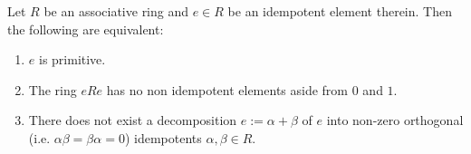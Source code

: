             \begin{proposition} \label{prop: primitive_idempotents_are_indecomposable}
                \cite[Proposition 21.8]{lam_first_course_in_noncommutative_rings} Let $R$ be an associative ring and $e \in R$ be an idempotent element therein. Then the following are equivalent:
                    \begin{enumerate}
                        \item $e$ is primitive.
                        \item The ring $eRe$ has no non idempotent elements aside from $0$ and $1$.
                        \item There does not exist a decomposition $e := \alpha + \beta$ of $e$ into non-zero orthogonal (i.e. $\alpha \beta = \beta \alpha = 0$) idempotents $\alpha, \beta \in R$.
                    \end{enumerate}
            \end{proposition}
